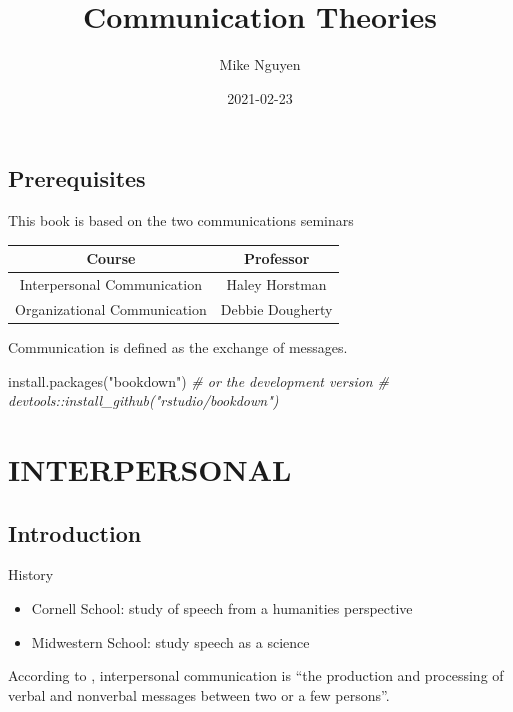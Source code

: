 \documentclass[
]{book}
\title{Communication Theories}
\author{Mike Nguyen}
\date{2021-02-23}
\newenvironment{Shaded}{\begin{snugshade}}{\end{snugshade}}
\newcommand{\CommentTok}[1]{\textcolor[rgb]{0.56,0.35,0.01}{\textit{#1}}}
\newcommand{\FunctionTok}[1]{\textcolor[rgb]{0.00,0.00,0.00}{#1}}
\newcommand{\NormalTok}[1]{#1}
\newcommand{\StringTok}[1]{\textcolor[rgb]{0.31,0.60,0.02}{#1}}
\providecommand{\tightlist}{%
  \setlength{\itemsep}{0pt}\setlength{\parskip}{0pt}}
\begin{document}
\maketitle

{
\setcounter{tocdepth}{1}
\tableofcontents
}
\hypertarget{prerequisites}{%
\chapter{Prerequisites}\label{prerequisites}}

This book is based on the two communications seminars

\begin{longtable}[]{@{}cc@{}}
\toprule
Course & Professor\tabularnewline
\midrule
\endhead
Interpersonal Communication & Haley Horstman\tabularnewline
Organizational Communication & Debbie Dougherty\tabularnewline
\bottomrule
\end{longtable}

Communication is defined as the exchange of messages.

\begin{Shaded}
\begin{Highlighting}[]
\FunctionTok{install.packages}\NormalTok{(}\StringTok{"bookdown"}\NormalTok{)}
\CommentTok{\# or the development version}
\CommentTok{\# devtools::install\_github("rstudio/bookdown")}
\end{Highlighting}
\end{Shaded}

\hypertarget{part-interpersonal}{%
\part{INTERPERSONAL}\label{part-interpersonal}}

\hypertarget{intro}{%
\chapter{Introduction}\label{intro}}

History

\begin{itemize}
\tightlist
\item
  Cornell School: study of speech from a humanities perspective\\
\item
  Midwestern School: study speech as a science
\end{itemize}

According to \citep{Baxter_2008}, interpersonal communication is ``the production and processing of verbal and nonverbal messages between two or a few persons''.
\end{document}

